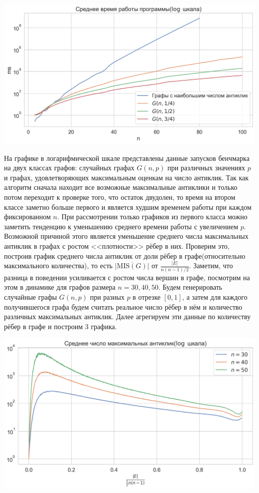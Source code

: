 \documentclass{article}
\begin{document}
\begin{center}
\includegraphics[scale=0.6]{plot.png}
\end{center}

На графике в логарифмической шкале представлены данные запусков бенчмарка на двух классах графов: случайных графах $G(n, p)$ при различных значениях $p$ и
графах, удовлетворяющих максимальным оценкам на число антиклик. Так как алгоритм сначала находит все возможные максимальные антиклики и
только потом переходит к проверке того, что остаток двудолен, то время на втором классе заметно больше первого и является худшим временем работы при
каждом фиксированном $n$. При рассмотрении только графиков из первого класса можно заметить тенденцию к уменьшению среднего времени работы с увеличением $p$.
Возможной причиной этого является уменьшение среднего числа максимальных антиклик в графах с ростом <<плотности>> рёбер в них. Проверим это, построив
график среднего числа антиклик от доли рёбер в графе(относительно максимального количества), то есть $\overline{|\text{MIS}(G)|}$ от $\frac{|E|}{n(n-1)/2}$. Заметим, что разница в поведении усиливается с
ростом числа вершин в графе, посмотрим на этом в динамике для графов размера $n=30, 40, 50$. Будем генерировать случайные графы $G(n, p)$ при разных $p$ в отрезке $[0, 1]$, а затем для каждого получившегося графа
будем считать реальное число рёбер в нём и количество различных максимальных антиклик. Далее агрегируем эти данные по количеству рёбер в графе и построим 3 графика.

\begin{center}
\includegraphics[scale=0.6]{plot1.png}
\end{center}
\end{document}
